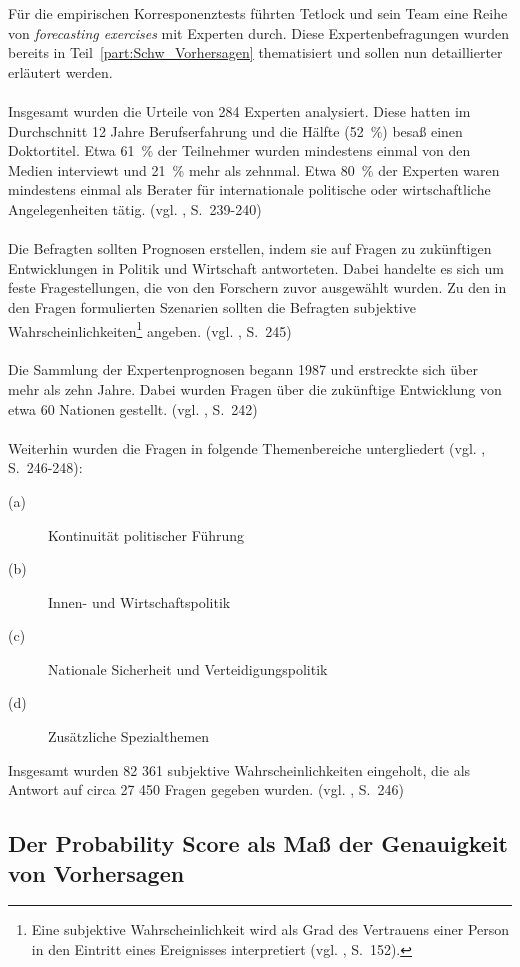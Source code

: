 Für die empirischen Korresponenztests führten Tetlock und sein Team eine Reihe
von \emph{forecasting exercises} mit Experten durch. Diese Expertenbefragungen
wurden bereits in Teil~\ref{part:Schw_Vorhersagen} thematisiert und sollen nun
detaillierter erläutert werden. \\ \\
Insgesamt wurden die Urteile von 284 Experten analysiert. Diese hatten im
Durchschnitt 12 Jahre Berufserfahrung und die Hälfte (52~\%) besaß einen
Doktortitel. Etwa 61~\% der Teilnehmer wurden mindestens einmal von den Medien
interviewt und 21~\% mehr als zehnmal. Etwa 80~\% der Experten waren mindestens
einmal als Berater für internationale politische oder wirtschaftliche
Angelegenheiten tätig. (vgl. \cite{Tetlock}, S.~239-240)\\ \\
Die Befragten sollten Prognosen erstellen, indem sie auf Fragen zu zukünftigen
Entwicklungen in Politik und Wirtschaft antworteten. Dabei handelte es sich um
feste Fragestellungen, die von den Forschern zuvor ausgewählt wurden. Zu den in
den Fragen formulierten Szenarien sollten die Befragten subjektive
Wahrscheinlichkeiten\footnote{
Eine subjektive Wahrscheinlichkeit wird als Grad des Vertrauens einer Person in
den Eintritt eines Ereignisses interpretiert (vgl. \cite{Eisenfuehr}, S.~152).}
angeben. (vgl. \cite{Tetlock}, S.~245)\\ \\
Die Sammlung der Expertenprognosen begann 1987 und erstreckte sich über mehr als
zehn Jahre. Dabei wurden Fragen über die zukünftige Entwicklung von etwa 60
Nationen gestellt. (vgl. \cite{Tetlock}, S.~242)\\ \\
Weiterhin wurden die Fragen in folgende Themenbereiche untergliedert
(vgl. \cite{Tetlock}, S.~246-248):
\begin{description}
\item[(a)] Kontinuität politischer Führung
\item[(b)] Innen- und Wirtschaftspolitik
\item[(c)] Nationale Sicherheit und Verteidigungspolitik
\item[(d)] Zusätzliche Spezialthemen
\end{description}
Insgesamt wurden 82 361 subjektive Wahrscheinlichkeiten eingeholt, die als
Antwort auf circa 27 450 Fragen gegeben wurden. (vgl. \cite{Tetlock}, S.~246)

\subsection{Der Probability Score als Maß der Genauigkeit von Vorhersagen}

